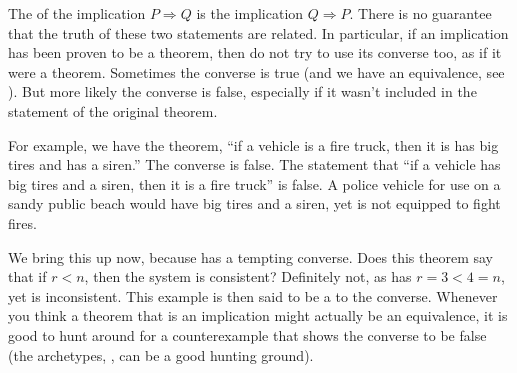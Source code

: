 The  of the implication $P\Rightarrow Q$ is the implication $Q\Rightarrow P$.  There is no guarantee that the truth of these two statements are related.  In particular, if an implication has been proven to be a theorem, then do not try to use its converse too, as if it were a theorem.  Sometimes the converse is true (and we have an equivalence, see ).  But more likely the converse is false, especially if it wasn't included in the statement of the original theorem.\par
%
For example, we have the theorem, ``if a vehicle is a fire truck, then it is has big tires and has a siren.''  The converse is false.  The statement that ``if a vehicle has big tires and a siren, then it is a fire truck'' is false.  A police vehicle for use on a sandy public beach would have big tires and a siren, yet is not equipped to fight fires.\par
%
We bring this up now, because  has a tempting converse.  Does this theorem say that if $r<n$, then the system is consistent?  Definitely not, as  has $r=3<4=n$, yet is inconsistent.  This example is then said to be a  to the converse.  Whenever you think a theorem that is an implication might actually be an equivalence, it is good to hunt around for a counterexample that shows the converse to be false (the archetypes, , can be a good hunting ground).
